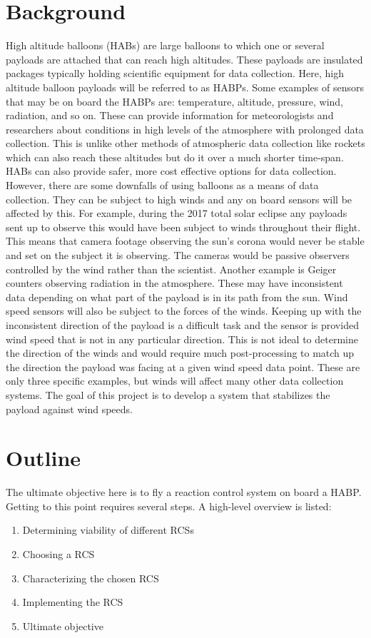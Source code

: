 \section{Background}
High altitude balloons (HABs) are large balloons to which one or several payloads are attached that can reach high altitudes. These payloads are insulated packages typically holding scientific equipment for data collection. Here, high altitude balloon payloads will be referred to as HABPs. Some examples of sensors that may be on board the HABPs are: temperature, altitude, pressure, wind, radiation, and so on. These can provide information for meteorologists and researchers about conditions in high levels of the atmosphere with prolonged data collection. This is unlike other methods of atmospheric data collection like rockets which can also reach these altitudes but do it over a much shorter time-span. HABs can also provide safer, more cost effective options for data collection. However, there are some downfalls of using balloons as a means of data collection. They can be subject to high winds and any on board sensors will be affected by this. For example, during the 2017 total solar eclipse any payloads sent up to observe this would have been subject to winds throughout their flight. This means that camera footage observing the sun's corona would never be stable and set on the subject it is observing. The cameras would be passive observers controlled by the wind rather than the scientist. Another example is Geiger counters observing radiation in the atmosphere. These may have inconsistent data depending on what part of the payload is in its path from the sun. Wind speed sensors will also be subject to the forces of the winds. Keeping up with the inconsistent direction of the payload is a difficult task and the sensor is provided wind speed that is not in any particular direction. This is not ideal to determine the direction of the winds and would require much post-processing to match up the direction the payload was facing at a given wind speed data point. These are only three specific examples, but winds will affect many other data collection systems. The goal of this project is to develop a system that stabilizes the payload against wind speeds. 
\section{Outline}
The ultimate objective here is to fly a reaction control system on board a HABP. Getting to this point requires several steps. A high-level overview is listed:
\begin{enumerate}
\item Determining viability of different RCSs
\item Choosing a RCS
\item Characterizing the chosen RCS
\item Implementing the RCS
\item Ultimate objective
\end{enumerate}

